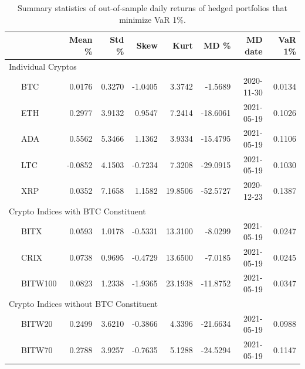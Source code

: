 \documentclass[11pt,a4paper,english]{article}
\begin{document}
{\begin{table}[!]
\end{table}\begin{table}[!] \centering %
  {%
\begin{tabular}{lrrrrrrr} \toprule
         {} &    Mean \% &     Std \% &      Skew &       Kurt &         MD \% &     MD date & VaR 1\% \\
\midrule
     \multicolumn{7}{l}{Individual Cryptos}                                                                                 \\
\ \ \ BTC     &  0.0176 &  0.3270 & -1.0405 &   3.3742 &  -1.5689 &  2020-11-30 &  0.0134 \\
\ \ \ ETH     &  0.2977 &  3.9132 &  0.9547 &   7.2414 & -18.6061 &  2021-05-19 &  0.1026 \\
\ \ \ ADA     &  0.5562 &  5.3466 &  1.1362 &   3.9334 & -15.4795 &  2021-05-19 &  0.1106 \\
\ \ \ LTC     & -0.0852 &  4.1503 & -0.7234 &   7.3208 & -29.0915 &  2021-05-19 &  0.1030 \\
\ \ \ XRP     &  0.0352 &  7.1658 &  1.1582 &  19.8506 & -52.5727 &  2020-12-23 &  0.1387 \\
   \multicolumn{7}{l}{Crypto Indices with BTC Constituent}                                                                  \\
\ \ \ BITX    &  0.0593 &  1.0178 & -0.5331 &  13.3100 &  -8.0299 &  2021-05-19 &  0.0247 \\
\ \ \ CRIX    &  0.0738 &  0.9695 & -0.4729 &  13.6500 &  -7.0185 &  2021-05-19 &  0.0245 \\
\ \ \ BITW100 &  0.0823 &  1.2338 & -1.9365 &  23.1938 & -11.8752 &  2021-05-19 &  0.0347 \\
    \multicolumn{7}{l}{Crypto Indices without BTC Constituent}                                                              \\
\ \ \ BITW20  &  0.2499 &  3.6210 & -0.3866 &   4.3396 & -21.6634 &  2021-05-19 &  0.0988 \\
\ \ \ BITW70  &  0.2788 &  3.9257 & -0.7635 &   5.1288 & -24.5294 &  2021-05-19 &  0.1147 \\
\bottomrule
\end{tabular}}
\caption{Summary statistics of out-of-sample daily returns of hedged portfolios that minimize VaR 1\%.}
\label{tab:VaR1_rh}


\end{table}}
\end{document}
